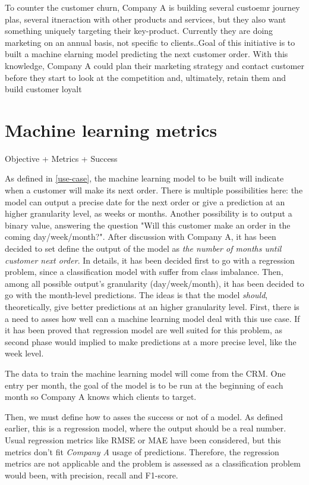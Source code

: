  
 To counter the customer churn, Company A is building several custoemr journey plas, several itneraction with other products and services, but they also want something uniquely targeting their key-product. Currently they are doing marketing on an annual basis, not specific to clients..Goal of this initiative is to built a machine elarning model predicting the next customer order. With this knowledge, Company A could plan their marketing strategy and contact customer before they start to look at the competition and, ultimately, retain them and build customer loyalt
 


\section{Machine learning metrics}
Objective + Metrics + Success 


As defined in \ref{use-case}, the machine learning model to be built will indicate when a customer will make its next order. There is multiple possibilities here: the model can output a precise date for the next order or give a prediction at an higher granularity level, as weeks or months. Another possibility is to output a binary value, answering the question "Will this customer make an order in the coming day/week/month?". After discussion with Company A, it has been decided to set define the output of the model as \textit{the number of months until customer next order}. In details, it has been decided first to go with a regression problem, since a classification model with suffer from class imbalance. Then, among all possible output's granularity (day/week/month), it has been decided to go with the month-level predictions. The ideas is that the model \textit{should}, theoretically, give better predictions at an higher granularity level. First, there is a need to asses how well can a machine learning model deal with this use case. If it has been proved that regression model are well suited for this problem, as second phase would implied to make predictions at a more precise level, like the week level.


The data to train the machine learning model will come from the CRM. One entry per month, the goal of the model is to be run at the beginning of each month so Company A knows which clients to target.


Then, we must define how to asses the success or not of a model. As defined earlier, this is a regression model, where the output should be a real number. Usual regression metrics like RMSE or MAE have been considered, but this metrics don't fit \textit{Company A} usage of predictions. Therefore, the regression metrics are not applicable and the problem is assessed as a classification problem would been, with precision, recall and F1-score. 

